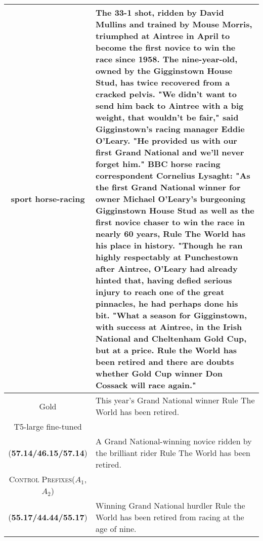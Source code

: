 \documentclass[11pt]{article}
\newcommand{\control}{\textsc{Control Prefixes}\xspace}
\newcommand{\bartl}{BART$_{\text {LARGE }}$}
\newcommand{\bl}[1]{{\color{blue}  #1}}
\newcommand{\rd}[1]{{\color{red}  #1}}
\begin{document}
\begin{table*}[bth!]
\begin{tabular}{c|p{}}
\bl{sport} \rd{horse-racing} & The 33-1 shot, ridden by David Mullins and trained by Mouse Morris, triumphed at Aintree in April to become the first novice to win the race since 1958.
The nine-year-old, owned by the Gigginstown House Stud, has twice recovered from a cracked pelvis.
"We didn't want to send him back to Aintree with a big weight, that wouldn't be fair," said Gigginstown's racing manager Eddie O'Leary.
"He provided us with our first Grand National and we'll never forget him."
BBC horse racing correspondent Cornelius Lysaght:
"As the first Grand National winner for owner Michael O'Leary's burgeoning Gigginstown House Stud as well as the first novice chaser to win the race in nearly 60 years, Rule The World has his place in history.
"Though he ran highly respectably at Punchestown after Aintree, O'Leary had already hinted that, having defied serious injury to reach one of the great pinnacles, he had perhaps done his bit.
"What a season for Gigginstown, with success at Aintree, in the Irish National and Cheltenham Gold Cup, but at a price. Rule the World has been retired and there are doubts whether Gold Cup winner Don Cossack will race again."  \\ \hline
Gold & This year's Grand National winner Rule The World has been retired.\\ \hline
T5-large fine-tuned\\(\textbf{57.14/46.15/57.14})

& A Grand National-winning novice ridden by the brilliant rider Rule The World has been retired.  \\ \hline
\control ($A_{1}$,$A_{2}$) \\(\textbf{{55.17/44.44/55.17}})
&Winning Grand National hurdler Rule the World has been retired from racing at the age of nine. \\ \midrule \hline
  \end{tabular}
  \caption{\textbf{XSum generated summaries} for T5-large fine-tuned and \control based on \bartl. These are presented alongside the source document and the sole gold reference. Source documents are truncated to 300 words if necessary. \textbf{ROUGE-1/ROUGE-2/ROUGE-L} are reported in bold. The \bl{news/sport} control prefix and the related \rd{sub-directory} control prefix are highlighted.}
  \label{tab:app_qualitative_1}
\end{table*}




 
\end{document}
